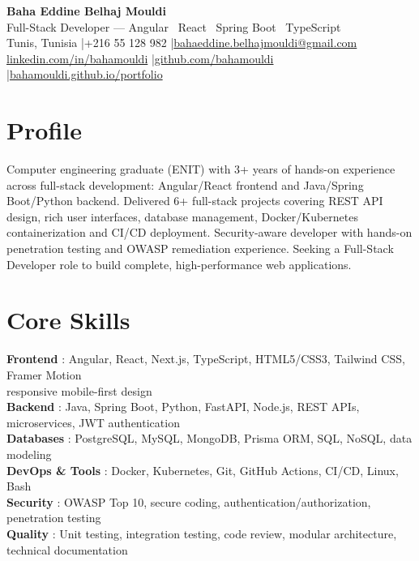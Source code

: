\documentclass[a4paper,10pt]{article}
\begin{document}
\begin{center}
{\LARGE\bfseries\color{navy} Baha Eddine Belhaj Mouldi}\\[3pt]
{\large Full-Stack Developer --- Angular \textbar\ React \textbar\ Spring Boot \textbar\ TypeScript}\\[5pt]
Tunis, Tunisia \quad|\quad +216 55 128 982 \quad|\quad \href{mailto:bahaeddine.belhajmouldi@gmail.com}{bahaeddine.belhajmouldi@gmail.com}\\[1pt]
\href{https://www.linkedin.com/in/bahamouldi}{linkedin.com/in/bahamouldi} \quad|\quad \href{https://github.com/bahamouldi}{github.com/bahamouldi} \quad|\quad \href{https://bahamouldi.github.io/portfolio/}{bahamouldi.github.io/portfolio}
\end{center}
\vspace{1pt}
\section{Profile}
Computer engineering graduate (ENIT) with 3+ years of hands-on experience across full-stack development: Angular/React frontend and Java/Spring Boot/Python backend. Delivered 6+ full-stack projects covering REST API design, rich user interfaces, database management, Docker/Kubernetes containerization and CI/CD deployment. Security-aware developer with hands-on penetration testing and OWASP remediation experience. Seeking a Full-Stack Developer role to build complete, high-performance web applications.
\section{Core Skills}
\textbf{Frontend} : Angular, React, Next.js, TypeScript, HTML5/CSS3, Tailwind CSS, Framer Motion\\[0.5pt]
\hspace*{1.5em} responsive mobile-first design\\[0.5pt]
\textbf{Backend} : Java, Spring Boot, Python, FastAPI, Node.js, REST APIs, microservices, JWT authentication\\[0.5pt]
\textbf{Databases} : PostgreSQL, MySQL, MongoDB, Prisma ORM, SQL, NoSQL, data modeling\\[0.5pt]
\textbf{DevOps \& Tools} : Docker, Kubernetes, Git, GitHub Actions, CI/CD, Linux, Bash\\[0.5pt]
\textbf{Security} : OWASP Top 10, secure coding, authentication/authorization, penetration testing\\[0.5pt]
\textbf{Quality} : Unit testing, integration testing, code review, modular architecture, technical documentation
\end{document}
